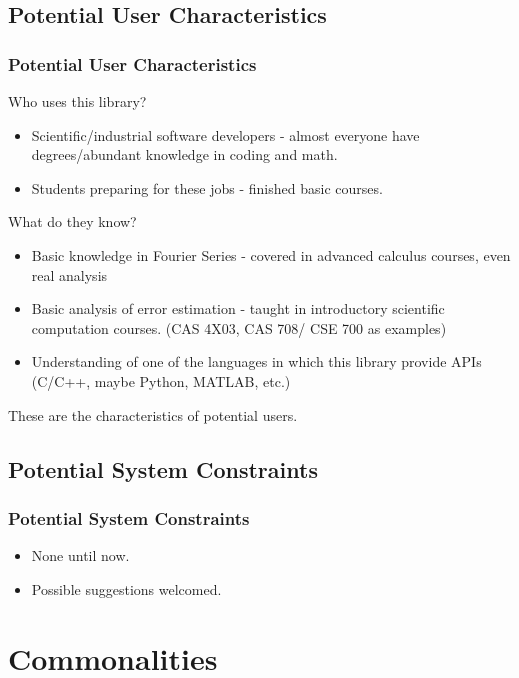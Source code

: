 \documentclass{beamer}
\begin{document}
	\subsection{Potential User Characteristics}
	\begin{frame}
		\frametitle{Potential User Characteristics}
		Who uses this library?
		\begin{itemize}
			\item Scientific/industrial software developers - almost everyone have degrees/abundant knowledge in coding and math.
			\item Students preparing for these jobs - finished basic courses.
		\end{itemize}
		What do they know?
		\begin{itemize}
			\item Basic knowledge in Fourier Series - covered in advanced calculus courses, even real analysis
			\item Basic analysis of error estimation - taught in introductory scientific computation courses. (CAS 4X03, CAS 708/ CSE 700 as examples)
			\item Understanding of one of the languages in which this library provide APIs (C/C++, maybe Python, MATLAB, etc.) 		
		\end{itemize}
		These are the characteristics of potential users.
	\end{frame}

	\subsection{Potential System Constraints}
	\begin{frame}
		\frametitle{Potential System Constraints}
		\begin{itemize}
			\item None until now.
			\item Possible suggestions welcomed.
		\end{itemize}
	\end{frame}

	\section{Commonalities}
\end{document}
